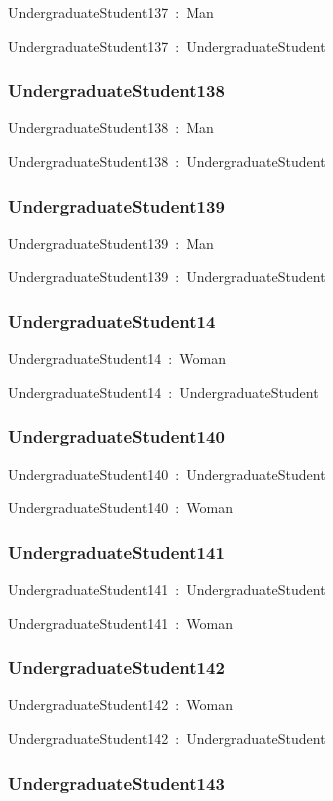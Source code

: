 \documentclass{article}
\begin{document}
UndergraduateStudent137~:~Man

UndergraduateStudent137~:~UndergraduateStudent

\subsubsection*{UndergraduateStudent138}

UndergraduateStudent138~:~Man

UndergraduateStudent138~:~UndergraduateStudent

\subsubsection*{UndergraduateStudent139}

UndergraduateStudent139~:~Man

UndergraduateStudent139~:~UndergraduateStudent

\subsubsection*{UndergraduateStudent14}

UndergraduateStudent14~:~Woman

UndergraduateStudent14~:~UndergraduateStudent

\subsubsection*{UndergraduateStudent140}

UndergraduateStudent140~:~UndergraduateStudent

UndergraduateStudent140~:~Woman

\subsubsection*{UndergraduateStudent141}

UndergraduateStudent141~:~UndergraduateStudent

UndergraduateStudent141~:~Woman

\subsubsection*{UndergraduateStudent142}

UndergraduateStudent142~:~Woman

UndergraduateStudent142~:~UndergraduateStudent

\subsubsection*{UndergraduateStudent143}
\end{document}

